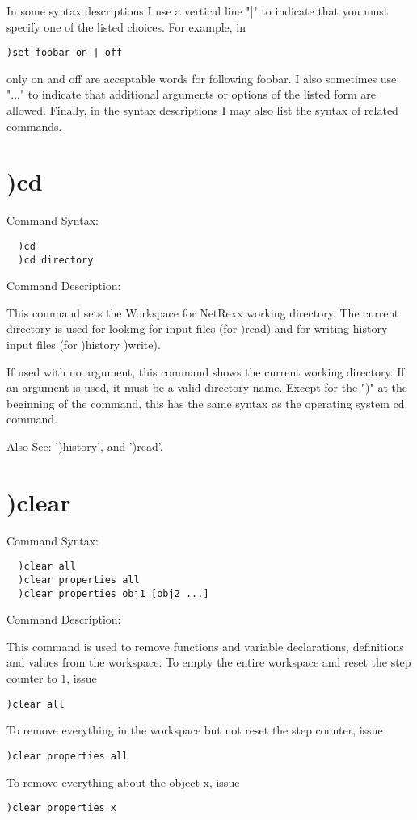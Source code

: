 In some syntax descriptions I use a vertical line "|" to indicate that you must specify one of the listed choices. For example, in

\begin{verbatim}
)set foobar on | off
\end{verbatim}
only on and off are acceptable words for following foobar. I also sometimes use "..." to indicate that additional arguments or options of the listed form are allowed. Finally, in the syntax descriptions I may also list the syntax of related commands.

\section{)cd}

Command Syntax:
\begin{verbatim}
  )cd
  )cd directory
\end{verbatim}
Command Description:

This command sets the Workspace for NetRexx working directory. The current directory is used for looking for input files (for )read) and for writing history input files (for )history )write).

If used with no argument, this command shows the current working directory. If an argument is used, it must be a valid directory name. Except for the ")" at the beginning of the command, this has the same syntax as the operating system cd command.

Also See: ')history', and ')read'.

\section{)clear}

Command Syntax:
\begin{verbatim}
  )clear all
  )clear properties all
  )clear properties obj1 [obj2 ...]
\end{verbatim}
Command Description:

This command is used to remove functions and variable declarations, definitions and values from the workspace. To empty the entire workspace and reset the step counter to 1, issue
\begin{verbatim}
)clear all
\end{verbatim}
To remove everything in the workspace but not reset the step counter, issue

\begin{verbatim}
)clear properties all
\end{verbatim}
To remove everything about the object x, issue
\begin{verbatim}
)clear properties x
\end{verbatim}

